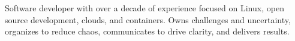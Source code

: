 


\begin{cvparagraph}

Software developer with over a decade of experience focused on Linux, open
source development, clouds, and containers. Owns challenges and uncertainty,
organizes to reduce chaos, communicates to drive clarity, and delivers results.

\end{cvparagraph}
